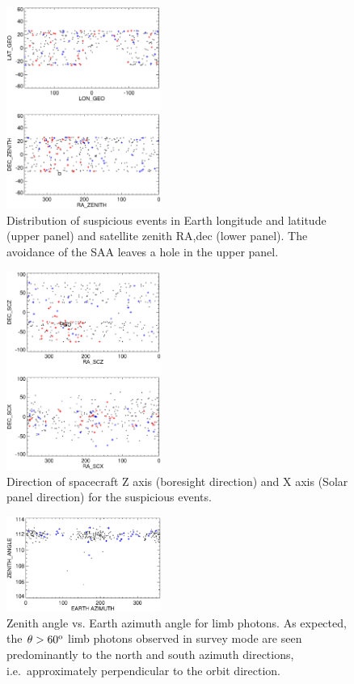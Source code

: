 \documentclass[aps,twocolumn,prd,superscriptaddress,showpacs,nofootinbib,fixfloat]{revtex4}
\newcommand{\degree}{^{\rm o}}
\begin{document}
\begin{figure}[p]
\centering
\includegraphics[width=0.45\textwidth]{plots/geo-lonlat.ps}
\caption{Distribution of suspicious events in Earth longitude and latitude
(upper panel) and satellite zenith RA,dec (lower panel).   The
avoidance of the SAA leaves a hole in the upper panel.}
\label{fig:geo-lonlat}
\end{figure}

\begin{figure}[p]
\centering
\includegraphics[width=0.45\textwidth]{plots/spacecraft-zx.ps}
\caption{Direction of spacecraft Z axis (boresight direction) and X axis
(Solar panel direction) for the suspicious events.
}
\label{fig:spacecraft-zx}
\end{figure}

\begin{figure}[p]
\centering
\includegraphics[width=0.45\textwidth]{plots/earth-az.ps}
\caption{Zenith angle vs. Earth azimuth angle for limb photons.  As expected,
  the $\theta > 60\degree$ limb photons observed in survey mode are seen
  predominantly to the north and south azimuth directions, i.e.~approximately
  perpendicular to the orbit direction.  }
\label{fig:earth-az}
\end{figure}
\end{document}
